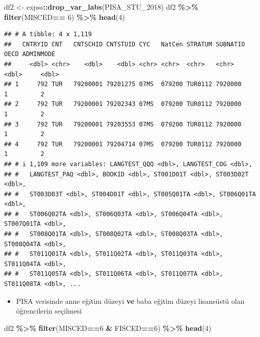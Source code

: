 \documentclass[
  oneside]{book}
\newenvironment{Shaded}{\begin{snugshade}}{\end{snugshade}}
\newcommand{\DecValTok}[1]{\textcolor[rgb]{0.00,0.00,0.81}{#1}}
\newcommand{\FunctionTok}[1]{\textcolor[rgb]{0.13,0.29,0.53}{\textbf{#1}}}
\newcommand{\NormalTok}[1]{#1}
\newcommand{\OtherTok}[1]{\textcolor[rgb]{0.56,0.35,0.01}{#1}}
\newcommand{\SpecialCharTok}[1]{\textcolor[rgb]{0.81,0.36,0.00}{\textbf{#1}}}
\providecommand{\tightlist}{%
  \setlength{\itemsep}{0pt}\setlength{\parskip}{0pt}}
\begin{document}
\begin{Shaded}
\begin{Highlighting}[]
\NormalTok{df2 }\OtherTok{\textless{}{-}}\NormalTok{ expss}\SpecialCharTok{::}\FunctionTok{drop\_var\_labs}\NormalTok{(PISA\_STU\_2018)}
\NormalTok{df2 }\SpecialCharTok{\%\textgreater{}\%}  \FunctionTok{filter}\NormalTok{(MISCED}\SpecialCharTok{==} \DecValTok{6}\NormalTok{) }\SpecialCharTok{\%\textgreater{}\%} \FunctionTok{head}\NormalTok{(}\DecValTok{4}\NormalTok{)}
\end{Highlighting}
\end{Shaded}

\begin{verbatim}
## # A tibble: 4 x 1,119
##   CNTRYID CNT   CNTSCHID CNTSTUID CYC   NatCen STRATUM SUBNATIO  OECD ADMINMODE
##     <dbl> <chr>    <dbl>    <dbl> <chr> <chr>  <chr>   <chr>    <dbl>     <dbl>
## 1     792 TUR   79200001 79201275 07MS  079200 TUR0112 7920000      1         2
## 2     792 TUR   79200001 79202343 07MS  079200 TUR0112 7920000      1         2
## 3     792 TUR   79200001 79203553 07MS  079200 TUR0112 7920000      1         2
## 4     792 TUR   79200001 79204714 07MS  079200 TUR0112 7920000      1         2
## # i 1,109 more variables: LANGTEST_QQQ <dbl>, LANGTEST_COG <dbl>,
## #   LANGTEST_PAQ <dbl>, BOOKID <dbl>, ST001D01T <dbl>, ST003D02T <dbl>,
## #   ST003D03T <dbl>, ST004D01T <dbl>, ST005Q01TA <dbl>, ST006Q01TA <dbl>,
## #   ST006Q02TA <dbl>, ST006Q03TA <dbl>, ST006Q04TA <dbl>, ST007Q01TA <dbl>,
## #   ST008Q01TA <dbl>, ST008Q02TA <dbl>, ST008Q03TA <dbl>, ST008Q04TA <dbl>,
## #   ST011Q01TA <dbl>, ST011Q02TA <dbl>, ST011Q03TA <dbl>, ST011Q04TA <dbl>,
## #   ST011Q05TA <dbl>, ST011Q06TA <dbl>, ST011Q07TA <dbl>, ST011Q08TA <dbl>, ...
\end{verbatim}

\begin{itemize}
\tightlist
\item
  PISA verisinde anne eğitim düzeyi \textbf{ve} baba eğitim düzeyi lisansüstü olan öğrencilerin seçilmesi
\end{itemize}

\begin{Shaded}
\begin{Highlighting}[]
\NormalTok{df2 }\SpecialCharTok{\%\textgreater{}\%} \FunctionTok{filter}\NormalTok{(MISCED}\SpecialCharTok{==}\DecValTok{6} \SpecialCharTok{\&}\NormalTok{ FISCED}\SpecialCharTok{==}\DecValTok{6}\NormalTok{)  }\SpecialCharTok{\%\textgreater{}\%} \FunctionTok{head}\NormalTok{(}\DecValTok{4}\NormalTok{)}
\end{Highlighting}
\end{Shaded}
\end{document}
